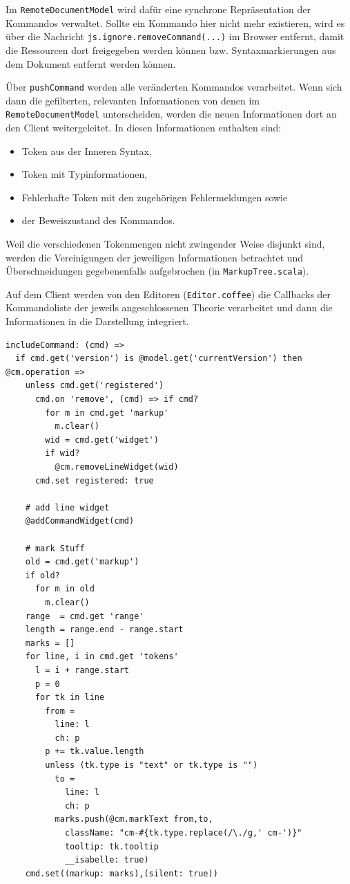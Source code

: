 Im \texttt{RemoteDocumentModel} wird dafür eine synchrone Repräsentation der Kommandos verwaltet.
Sollte ein Kommando hier nicht mehr existieren, wird es über die Nachricht
\texttt{js.ignore.removeCommand(...)} im Browser entfernt, damit die Ressourcen dort freigegeben
werden können bzw. Syntaxmarkierungen aus dem Dokument entfernt werden können.

Über \texttt{pushCommand} werden alle veränderten Kommandos verarbeitet. Wenn sich dann die
gefilterten, relevanten Informationen von denen im \texttt{RemoteDocumentModel} unterscheiden,
werden die neuen Informationen dort an den Client weitergeleitet. In diesen Informationen enthalten
sind:

\begin{itemize}
  \item Token aus der Inneren Syntax,
  \item Token mit Typinformationen,
  \item Fehlerhafte Token mit den zugehörigen Fehlermeldungen sowie
  \item der Beweiszustand des Kommandos.
\end{itemize}

Weil die verschiedenen Tokenmengen nicht zwingender Weise disjunkt sind, werden die Vereinigungen
der jeweiligen Informationen betrachtet und Überschneidungen gegebenenfalls aufgebrochen (in
\texttt{MarkupTree.scala}).

Auf dem Client werden von den Editoren (\texttt{Editor.coffee}) die Callbacks der Kommandoliste der
jeweils angeschlossenen Theorie verarbeitet und dann die Informationen in die Darstellung
integriert.

\begin{lstlisting}
includeCommand: (cmd) => 
  if cmd.get('version') is @model.get('currentVersion') then @cm.operation =>
    unless cmd.get('registered')      
      cmd.on 'remove', (cmd) => if cmd?
        for m in cmd.get 'markup'
          m.clear()
        wid = cmd.get('widget')
        if wid?
          @cm.removeLineWidget(wid)
      cmd.set registered: true

    # add line widget
    @addCommandWidget(cmd)

    # mark Stuff
    old = cmd.get('markup')
    if old?
      for m in old
        m.clear()
    range  = cmd.get 'range'
    length = range.end - range.start
    marks = []
    for line, i in cmd.get 'tokens'
      l = i + range.start
      p = 0
      for tk in line
        from = 
          line: l
          ch: p
        p += tk.value.length
        unless (tk.type is "text" or tk.type is "")
          to =
            line: l
            ch: p              
          marks.push(@cm.markText from,to,
            className: "cm-#{tk.type.replace(/\./g,' cm-')}"
            tooltip: tk.tooltip
            __isabelle: true)
    cmd.set((markup: marks),(silent: true))
\end{lstlisting}



